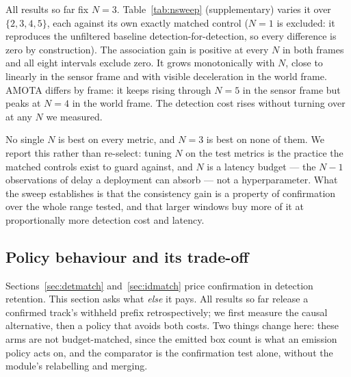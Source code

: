 All results so far fix $N{=}3$. Table~\ref{tab:nsweep} (supplementary) varies it over
$\{2,3,4,5\}$, each against its own exactly matched control ($N{=}1$ is
excluded: it reproduces the unfiltered baseline detection-for-detection, so
every difference is zero by construction). The association gain is positive at
every $N$ in both frames and all eight intervals exclude zero. It grows
monotonically with $N$, close to linearly in the sensor frame and with visible
deceleration in the world frame. AMOTA differs by frame: it keeps rising
through $N{=}5$ in the sensor frame but peaks at $N{=}4$ in the world frame.
The detection cost rises without
turning over at any $N$ we measured.

No single $N$ is best on every metric, and $N{=}3$ is best on none of them. We
report this rather than re-select: tuning $N$ on the test metrics is the
practice the matched controls exist to guard against, and $N$ is a latency
budget --- the $N{-}1$ observations of delay a deployment can absorb --- not a
hyperparameter. What the sweep establishes is that the consistency gain is a
property of confirmation over the whole range tested, and that larger windows
buy more of it at proportionally more detection cost and latency.

\subsection{Policy behaviour and its trade-off}
\label{sec:emissionabl}

Sections~\ref{sec:detmatch} and~\ref{sec:idmatch} price confirmation in
detection retention. This section asks what \emph{else} it pays. All results so
far release a confirmed track's withheld prefix retrospectively; we first
measure the causal alternative, then a policy that avoids both costs. Two things
change here: these arms are not budget-matched, since the emitted box count is what an emission policy acts on, and the comparator is the confirmation test
alone, without the module's relabelling and merging.

